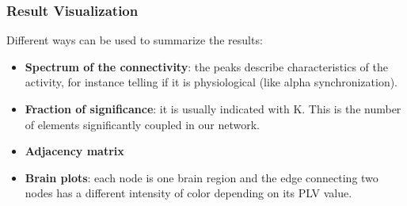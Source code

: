 \subsubsection{Result Visualization}
Different ways can be used to summarize the results:
\begin{itemize}
    \item \textbf{Spectrum of the connectivity}: the peaks describe characteristics of the activity, for instance telling if it is physiological (like alpha synchronization).
    \item \textbf{Fraction of significance}: it is usually indicated with K. This is the number of elements significantly coupled in our network.
    \item \textbf{Adjacency matrix}
    \item \textbf{Brain plots}: each node is one brain region and the edge connecting two nodes has a different intensity of color depending on its PLV value.
\end{itemize}
\begin{figure}[H]
    \centering
\end{figure}
\begin{figure}[H]
    \centering
\end{figure}
